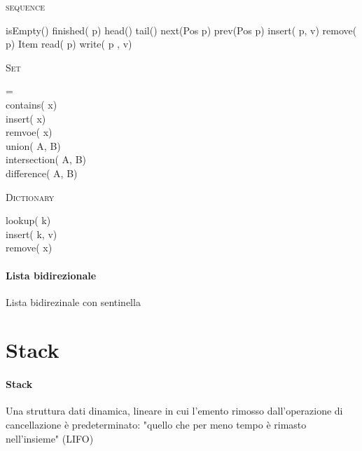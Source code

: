 \documentclass[../../notes.tex]{subfiles}
\begin{document}
  \begin{algorithm}[H]
    \NoCaptionOfAlgo
    \caption{\textsc{sequence}}

     isEmpty()\;
     finished( p)\;
     head()\;
     tail()\;
     next(Pos p)\;
     prev(Pos p)\;
     insert( p,  v)\;
     remove( p)\;
    Item read( p)\;
    write( p ,  v)\;
  \end{algorithm}

  \begin{algorithm}[H]
    \NoCaptionOfAlgo
    \caption{\textsc{Set}}
     = \\
     contains( x)\\
    insert( x)\\
    remvoe( x)\\
     union( A,  B)\\
     intersection( A,  B)\\
     difference( A,  B)\\
  \end{algorithm}

  \begin{algorithm}[H]
    \NoCaptionOfAlgo
    \caption{\textsc{Dictionary}}

     lookup( k)\\
    insert( k,  v)\\
    remove( x)\\
  \end{algorithm}

  \paragraph{Lista bidirezionale} Lista bidirezinale con sentinella

  \section{Stack}
  \paragraph{Stack} Una struttura dati dinamica, lineare in cui l'emento rimosso dall'operazione di cancellazione è predeterminato: "quello che per meno tempo è rimasto nell'insieme" (LIFO)
\end{document}
